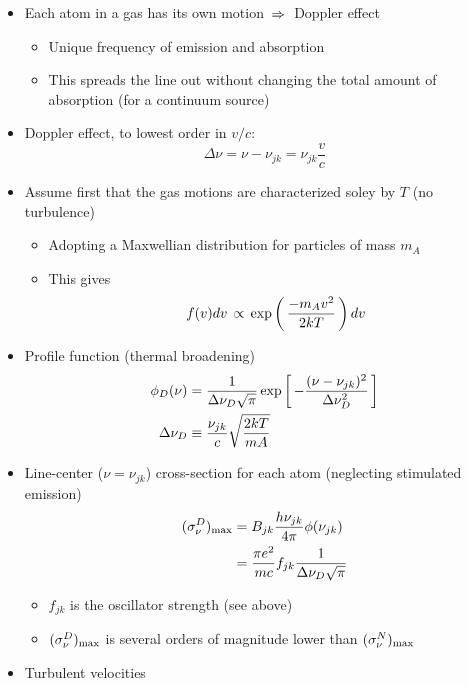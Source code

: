 \documentclass[12pt,letterpaper]{article}
\begin{document}
\begin{Aenumerate}
\begin{itemize}
	\begin{itemize}
	\item Each atom in a gas has its own motion $\, \Rightarrow \>$ Doppler effect
	\begin{itemize}
		\item Unique frequency of emission and absorption
		\item This spreads the line out without changing the total amount of absorption (for a continuum source)
	\end{itemize}
	\item Doppler effect, to lowest order in $v/c$:
	\begin{equation}
	\Delta\nu = \nu - \nu_{jk} = \nu_{jk} \frac{v}{c}
	\end{equation}
	\item Assume first that the gas motions are characterized
	soley by $T$ (no turbulence)
		\begin{itemize}
		\item Adopting a Maxwellian distribution for particles of mass $m_A$
		\item This gives
	\begin{equation}
	f(v) dv \, \propto \, \exp \left ( \, \frac{-m_A v^2}{2kT} \, \right ) dv
	\end{equation}
		\end{itemize}
	\item Profile function (thermal broadening)
	\begin{align}
	\phi_D(\nu) &= \frac{1}{\Delta \nu_D \sqrt{\pi}} 
	\exp \left [ \, - \frac{(\nu - \nu_{jk})^2}{\Delta \nu_D^2} \, \right ] \\
	\Delta \nu_D &\equiv \frac{\nu_{jk}}{c} \sqrt{\frac{2kT}{mA}}
	\end{align}
	\item Line-center ($\nu = \nu_{jk}$) cross-section for each atom
	(neglecting stimulated emission)
	\begin{align}
	(\sigma_\nu^D)_{\rm max} &= B_{jk} \frac{h \nu_{jk}}{4\pi} \phi(\nu_{jk})  \\
	    &= \frac{\pi e^2}{mc} f_{jk} \frac{1}{\Delta \nu_D \sqrt{\pi}}
	\label{eqn:linecenter}
	\end{align}
		\begin{itemize}
		\item $f_{jk}$ is the oscillator strength (see above)
		\item $(\sigma_\nu^D)_{\rm max}$ is several orders of magnitude
		lower than $(\sigma_\nu^N)_{\rm max}$
		\end{itemize}
	\item Turbulent velocities 

\end{itemize}
\end{itemize}
\end{Aenumerate}
\end{document}
